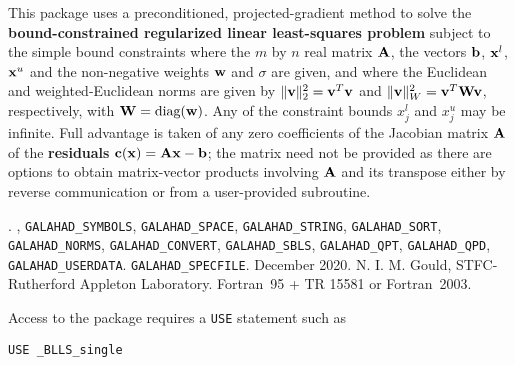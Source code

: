 \documentclass{galahad}
\newcommand{\packagename}{BLLS}
\newcommand{\fullpackagename}{\libraryname\_\packagename}
\begin{document}
\galheader


\galsummary
This package uses a preconditioned, projected-gradient method
to solve the {\bf bound-constrained regularized linear least-squares problem}
subject to the simple bound constraints
where the $m$ by $n$ real matrix ${\mathbf{A}}$, the vectors
${\mathbf{b}}$, ${\mathbf{x}}^{l}$, ${\mathbf{x}}^{u}$ and the non-negative weights ${\mathbf{w}}$ and
$\sigma$ are given, and where the Euclidean and weighted-Euclidean norms
are given by $\|{\mathbf{v}}\|_2^2 = {\mathbf{v}}^T {\mathbf{v}}$ and $\|{\mathbf{v}}\|_W^2 = {\mathbf{v}}^T {\mathbf{W}} {\mathbf{v}}$,
respectively, with ${\mathbf{W}} = \mbox{diag}({\mathbf{w}})$.
Any of the constraint bounds $x_{j}^{l}$ and $x_{j}^{u}$ may be infinite.
Full advantage is taken of any zero coefficients of the Jacobian matrix ${\mathbf{A}}$
of the {\bf residuals} ${\mathbf{c}}({\mathbf{x}}) = {\mathbf{A}} {\mathbf{x}} - {\mathbf{b}}$;
the matrix need not be provided as there are options to obtain matrix-vector
products involving ${\mathbf{A}}$ and its transpose either by reverse communication
or from a user-provided subroutine.


\galattributes
\galversions{\tt  \fullpackagename\_single, \fullpackagename\_double}.
,
{\tt GALAHAD\-\_SY\-M\-BOLS},
{\tt GALAHAD\-\_\-SPACE},
{\tt GALAHAD\_STRING},
{\tt GALAHAD\_SORT},
{\tt GALAHAD\_NORMS},
{\tt GALAHAD\_CONVERT},
{\tt GALAHAD\_SBLS},
{\tt GALAHAD\_QPT},
{\tt GALAHAD\_QPD},
{\tt GALAHAD\_USERDATA}.
{\tt GALAHAD\_SPECFILE}.
\galdate December 2020.
\galorigin N. I. M. Gould, STFC-Rutherford Appleton Laboratory.
\gallanguage Fortran~95 + TR 15581 or Fortran~2003.


\galhowto


Access to the package requires a {\tt USE} statement such as

\medskip{}

\hspace{8mm} {\tt USE \fullpackagename\_single}
\end{document}
